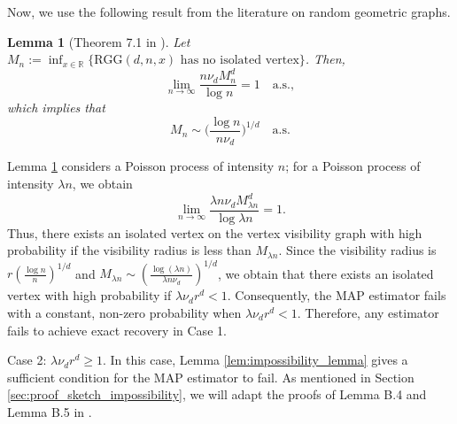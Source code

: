 \documentclass{article}
\newcommand{\R}{\mathbb{R}}
\newcommand{\1}{\mathbbm{1}}
\theoremstyle{definition}
\theoremstyle{plain}
\newtheorem{lemma}{Lemma}
\begin{document}
Now, we use the following result from the literature on random geometric graphs.
\begin{lemma}[Theorem 7.1 in \cite{Penrose2003}]
\label{lem:isolated_vertex}
    Let $M_n := \inf_{x \in \R}\{\text{RGG}(d, n, x) \text{ has no isolated vertex}\}$. Then, 
    \begin{equation*}
        \lim_{n \to \infty} \frac{n \nu_d M_n^d}{\log n} = 1 \quad \text{a.s.},
    \end{equation*}
    which implies that
    \begin{equation*}
        M_n \sim \bigg(\frac{\log n}{n \nu_d}\bigg)^{1/d} \quad \text{a.s.}
    \end{equation*}
\end{lemma}
Lemma \ref{lem:isolated_vertex} considers a Poisson process of intensity $n$; for a Poisson process of intensity $\lambda n$, we obtain 
\begin{equation*}
    \lim_{n \to \infty} \frac{\lambda n \nu_d M_{\lambda n}^d}{\log \lambda n} = 1.
\end{equation*}
Thus, there exists an isolated vertex on the vertex visibility graph with high probability if the visibility radius is less than $M_{\lambda n}$. Since the visibility radius is $r(\frac{\log n}{n})^{1/d}$ and $M_{\lambda n} \sim (\frac{\log (\lambda n)}{\lambda n \nu_d})^{1/d}$, we obtain that there exists an isolated vertex with high probability if $\lambda \nu_d r^d < 1$. Consequently, the MAP estimator fails with a constant, non-zero probability when $\lambda \nu_d r^d < 1$. Therefore, any estimator fails to achieve exact recovery in Case 1.

Case 2: $\lambda \nu_d r^d \geq 1$. In this case, Lemma \ref{lem:impossibility_lemma} gives a sufficient condition for the MAP estimator to fail. As mentioned in Section \ref{sec:proof_sketch_impossibility}, we will adapt the proofs of Lemma B.4 and Lemma B.5 in \cite{Gaudio+2025}.
\end{document}
